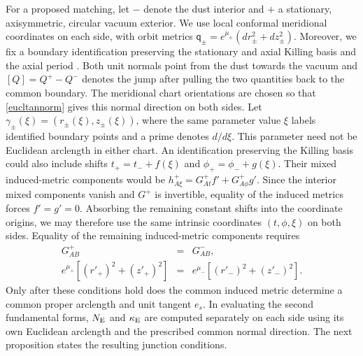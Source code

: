 \documentclass[amsmath,amsfonts,amssymb,aps,pra,superscriptaddress,10pt]{revtex4-2}
\numberwithin{equation}{section}
\theoremstyle{plain}
\theoremstyle{definition}
\theoremstyle{remark}
\theoremstyle{definition}
\begin{document}
For a proposed matching, let $-$ denote the dust interior and $+$ a stationary, axisymmetric, circular vacuum exterior. We use local conformal meridional coordinates on each side, with orbit metrics $\mathsf{q}_\pm=e^{\mu_\pm}(dr_\pm^2+dz_\pm^2)$. Moreover, we fix a boundary identification preserving the stationary and axial Killing basis and the axial period \cite{Vera2002CQG}. Both unit normals point from the dust towards the vacuum and $[Q]=Q^+-Q^-$ denotes the jump after pulling the two quantities back to the common boundary. The meridional chart orientations are chosen so that \eqref{eucltannorm} gives this normal direction on both sides. Let $\gamma_\pm(\xi)=(r_\pm(\xi),z_\pm(\xi))$, where the same parameter value $\xi$ labels identified boundary points and a prime denotes $d/d\xi$. This parameter need not be Euclidean arclength in either chart. An identification preserving the Killing basis could also include shifts $t_+=t_-+f(\xi)$ and $\phi_+=\phi_-+g(\xi)$. Their mixed induced-metric components would be $h^+_{A\xi}=G^+_{At}f'+G^+_{A\phi}g'$. Since the interior mixed components vanish and $G^+$ is invertible, equality of the induced metrics forces $f'=g'=0$. Absorbing the remaining constant shifts into the coordinate origins, we may therefore use the same intrinsic coordinates $(t,\phi,\xi)$ on both sides. Equality of the remaining induced-metric components requires
\begin{eqnarray}
G^+_{AB}&=&G^-_{AB},\label{commparffG}\\
e^{\mu_+}[(r'_+)^2+(z'_+)^2]&=&e^{\mu_-}[(r'_-)^2+(z'_-)^2].
\label{commparffm}
\end{eqnarray}
Only after these conditions hold does the common induced metric determine a common proper arclength and unit tangent $e_s$. In evaluating the second fundamental forms, $N_{\rm{E}}$ and $\kappa_{\rm{E}}$ are computed separately on each side using its own Euclidean arclength and the prescribed common normal direction. The next proposition states the resulting junction conditions.
\end{document}
